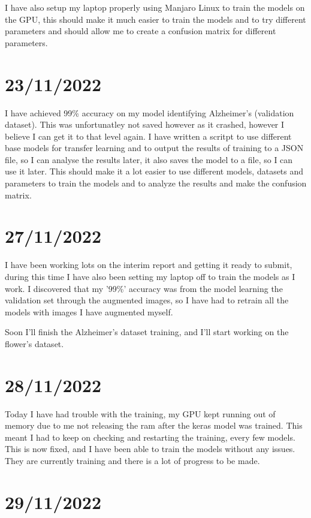 \documentclass[]{final_report}
\begin{document}
I have also setup my laptop properly using Manjaro Linux to train the models on the GPU, this should make it much easier to train the models and to try different parameters and should allow me to create a confusion matrix for different parameters.

\section*{23/11/2022}

I have achieved 99\% accuracy on my model identifying Alzheimer's (validation dataset). This was unfortunatley not saved however as it crashed, however I believe I can get it to that level again.
I have written a scritpt to use different base models for transfer learning and to output the results of training to a JSON file, so I can analyse the results later, it also saves the model to a file, so I can use it later.
This should make it a lot easier to use different models, datasets and parameters to train the models and to analyze the results and make the confusion matrix.

\section*{27/11/2022}
I have been working lots on the interim report and getting it ready to submit, during this time I have also been setting my laptop off to train the models
as I work. I discovered that my '99\%' accuracy was from the model learning the validation set through the augmented images, so I have had to retrain all the
models with images I have augmented myself.

Soon I'll finish the Alzheimer's dataset training, and I'll start working on the flower's dataset.

\section*{28/11/2022}

Today I have had trouble with the training, my GPU kept running out of memory due to me not releasing the ram after the keras model was trained. This meant I had to keep on checking and restarting the training, every few models. This is now fixed, and I have been able to train the models without any issues. They are currently training and there is a lot of progress to be made.

\section*{29/11/2022}
\end{document}
